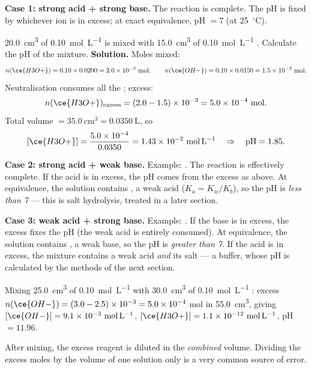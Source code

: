 \documentclass[11pt]{article}
\newcommand{\cle}[1]{{\popxbold\color{popdark}#1}}
\begin{document}
\textbf{Case 1: strong acid + strong base.} The reaction  is complete. The pH is fixed by whichever ion is in excess; at exact equivalence, pH $= 7$ (at \SI{25}{\ensuremath{{}^{\circ}\mathrm{C}}}).

\begin{exoresolu}
\SI{20.0}{cm^3} of \SI{0.10}{mol.L^{-1}}  is mixed with \SI{15.0}{cm^3} of \SI{0.10}{mol.L^{-1}} . Calculate the pH of the mixture.
\tcblower
\textbf{Solution.} Moles mixed:
\[ n(\ce{H3O+}) = 0.10 \times 0.0200 = 2.0\times10^{-3}\ \mathrm{mol}, \qquad n(\ce{OH-}) = 0.10\times 0.0150 = 1.5\times10^{-3}\ \mathrm{mol}. \]
Neutralisation  consumes all the ; excess:
\[ n(\ce{H3O+})_{\text{excess}} = (2.0 - 1.5)\times10^{-3} = 5.0\times10^{-4}\ \mathrm{mol}. \]
Total volume $= 35.0\ \mathrm{cm^3} = 0.0350\ \mathrm{L}$, so
\[ [\ce{H3O+}] = \frac{5.0\times10^{-4}}{0.0350} = 1.43\times10^{-2}\ \mathrm{mol\,L^{-1}} \quad\Rightarrow\quad \mathrm{pH} = 1.85. \]
\end{exoresolu}

\textbf{Case 2: strong acid + weak base.} Example: . The reaction is effectively complete. If the acid is in excess, the pH comes from the excess  as above. At equivalence, the solution contains , a weak acid ($K_a = K_w/K_b$), so the pH is \emph{less than 7} — this is salt hydrolysis, treated in a later section.

\textbf{Case 3: weak acid + strong base.} Example: . If the base is in excess, the excess  fixes the pH (the weak acid is entirely consumed). At equivalence, the solution contains , a weak base, so the pH is \emph{greater than 7}. If the acid is in excess, the mixture contains a weak acid \emph{and} its salt — a \cle{buffer}, whose pH is calculated by the methods of the next section.

\begin{exemplebox}
Mixing \SI{25.0}{cm^3} of \SI{0.10}{mol.L^{-1}}  with \SI{30.0}{cm^3} of \SI{0.10}{mol.L^{-1}} : excess $n(\ce{OH-}) = (3.0 - 2.5)\times10^{-3} = 5.0\times10^{-4}$ mol in \SI{55.0}{cm^3}, giving $[\ce{OH-}] = 9.1\times10^{-3}\ \mathrm{mol\,L^{-1}}$, $[\ce{H3O+}] = 1.1\times10^{-12}\ \mathrm{mol\,L^{-1}}$, pH $= 11.96$.
\end{exemplebox}

\begin{attention}
After mixing, the excess reagent is diluted in the \emph{combined} volume. Dividing the excess moles by the volume of one solution only is a very common source of error.
\end{attention}
\end{document}
